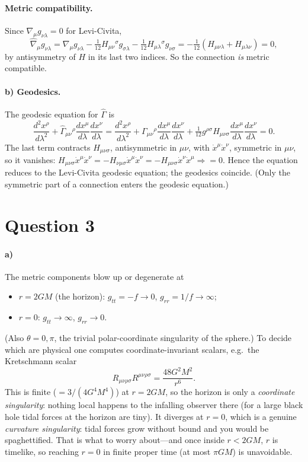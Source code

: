 \documentclass[11pt]{article}
\begin{document}
\paragraph{Metric compatibility.} Since $\nabla_\mu g_{\nu\lambda}=0$ for Levi-Civita,
\[
\hat\nabla_\mu g_{\nu\lambda}=\nabla_\mu g_{\nu\lambda}-\tfrac{1}{12}H_{\mu\nu}{}^{\sigma}g_{\sigma\lambda}-\tfrac{1}{12}H_{\mu\lambda}{}^{\sigma}g_{\nu\sigma}
=-\tfrac{1}{12}\left(H_{\mu\nu\lambda}+H_{\mu\lambda\nu}\right)=0,
\]
by antisymmetry of $H$ in its last two indices. So the connection \emph{is} metric compatible.

\paragraph{b) Geodesics.} The geodesic equation for $\hat\Gamma$ is
\[
\frac{d^2x^\rho}{d\lambda^2}+\hat\Gamma_{\mu\nu}{}^\rho\frac{dx^\mu}{d\lambda}\frac{dx^\nu}{d\lambda}
=\frac{d^2x^\rho}{d\lambda^2}+\Gamma_{\mu\nu}{}^\rho\frac{dx^\mu}{d\lambda}\frac{dx^\nu}{d\lambda}+\tfrac{1}{12}g^{\rho\sigma}H_{\mu\nu\sigma}\frac{dx^\mu}{d\lambda}\frac{dx^\nu}{d\lambda}=0.
\]
The last term contracts $H_{\mu\nu\sigma}$, antisymmetric in $\mu\nu$, with $\dot x^\mu\dot x^\nu$, symmetric in $\mu\nu$, so it vanishes:
$H_{\mu\nu\sigma}\dot x^\mu\dot x^\nu=-H_{\nu\mu\sigma}\dot x^\mu\dot x^\nu=-H_{\mu\nu\sigma}\dot x^\nu\dot x^\mu\Rightarrow=0$.
Hence the equation reduces to the Levi-Civita geodesic equation; the geodesics coincide. (Only the symmetric part of a connection enters the geodesic equation.)

\section*{Question 3}
\paragraph{a)} The metric components blow up or degenerate at
\begin{itemize}
\item $r=2GM$ (the horizon): $g_{tt}=-f\to0$, $g_{rr}=1/f\to\infty$;
\item $r=0$: $g_{tt}\to\infty$, $g_{rr}\to0$.
\end{itemize}
(Also $\theta=0,\pi$, the trivial polar-coordinate singularity of the sphere.) To decide which are physical one computes coordinate-invariant scalars, e.g.\ the Kretschmann scalar
\[
R_{\mu\nu\rho\sigma}R^{\mu\nu\rho\sigma}=\frac{48G^2M^2}{r^6}.
\]
This is finite ($=3/(4G^4M^4)$) at $r=2GM$, so the horizon is only a \emph{coordinate singularity}: nothing local happens to the infalling observer there (for a large black hole tidal forces at the horizon are tiny). It diverges at $r=0$, which is a genuine \emph{curvature singularity}: tidal forces grow without bound and you would be spaghettified. That is what to worry about---and once inside $r<2GM$, $r$ is timelike, so reaching $r=0$ in finite proper time (at most $\pi GM$) is unavoidable.
\end{document}
